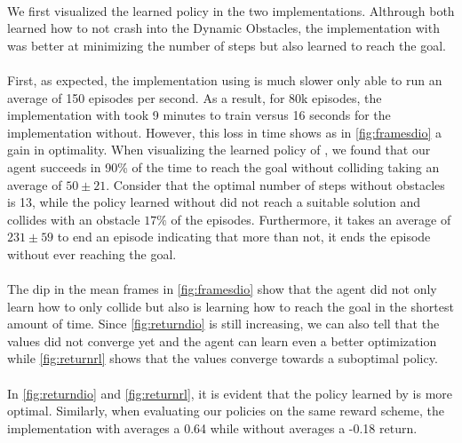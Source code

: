     \paragraph{}
    We first visualized the learned policy in the two implementations. Althrough both learned 
    how to not crash into the Dynamic Obstacles, the implementation with \dio{} was better at minimizing the number of steps 
    but also learned to reach the goal. 

    \paragraph{}
    First, as expected, the implementation using \dio{} is much slower only able to run 
    an average of 150 episodes per second. As a result, for 80k episodes, the implementation with \dio{} 
    took 9 minutes to train versus 16 seconds for the implementation without. However, this loss in time shows as in \ref{fig:framesdio} 
    a gain in optimality. When visualizing the learned policy of \dio{}, we found that our agent succeeds in 90\% 
    of the time to reach the goal without colliding taking an average of $50 \pm 21$. Consider that 
    the optimal number of steps without obstacles is 13, while the policy learned without \dio{} did not reach a suitable solution and collides with an obstacle $17\%$ of the episodes. Furthermore, it takes an average of $231 \pm 59$ to end an episode 
    indicating that more than not, it ends the episode without ever reaching the goal. 


    \paragraph{}
    The dip in the mean frames in \ref{fig:framesdio} show that the agent did not only learn 
    how to only collide but also is learning how to reach the goal in the shortest amount of time. 
    Since \ref{fig:returndio} is still increasing, we can also tell that the values did not converge yet and 
    the agent can learn even a better optimization while \ref{fig:returnrl} shows that the values converge towards
    a suboptimal policy.


    \paragraph{}
    In \ref{fig:returndio} and \ref{fig:returnrl}, it is evident that the policy learned by \dio{} 
    is more optimal. Similarly, when evaluating our policies on the same reward scheme, 
    the implementation with \dio{} averages a 0.64 while without \dio{} averages a -0.18 return.

